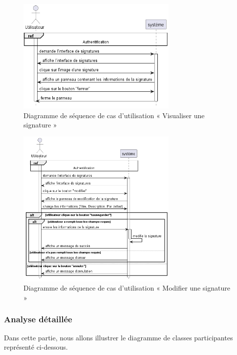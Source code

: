 \begin{figure}[H]
  \centering
  \includegraphics[width=0.7\textwidth]{out/diagrams/signatures/view/view_signature}
  \caption{Diagramme de séquence de cas d'utilisation « Visualiser une signature  »}
  \label{fig:sequence_view_signature}
\end{figure}

\begin{figure}[H]
  \centering
  \includegraphics[width=0.7\textwidth]{out/diagrams/signatures/update/update_signature}
  \caption{Diagramme de séquence de cas d'utilisation « Modifier une signature  »}
  \label{fig:sequence_update_signature}
\end{figure}

\subsubsection{Analyse détaillée}
Dans cette partie, nous allons illustrer le diagramme de classes participantes représenté ci-dessous.\\

